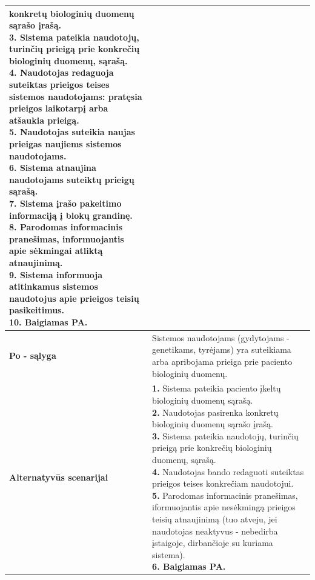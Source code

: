 \documentclass[12pt]{article}
\begin{document}
\begin{table}[htb!]
\begin{tabular}{|m{3cm}|m{13.7cm}|}
{{{            konkretų biologinių duomenų sąrašo įrašą.} \\
            \textbf{3.} {Sistema pateikia naudotojų,
            turinčių prieigą prie konkrečių biologinių duomenų, sąrašą.} \\
            \textbf{4.} \textcolor{dartmouthgreen}{Naudotojas redaguoja
            suteiktas prieigos teises sistemos naudotojams: pratęsia prieigos
            laikotarpį arba atšaukia prieigą.} \\
            \textbf{5.} \textcolor{dartmouthgreen}{Naudotojas suteikia
            naujas prieigas naujiems sistemos naudotojams.} \\
            \textbf{6.} {Sistema atnaujina naudotojams
            suteiktų prieigų sąrašą.} \\
            \textbf{7.} {Sistema įrašo pakeitimo
            informaciją į blokų grandinę.} \\
            \textbf{8.} {Parodomas informacinis
            pranešimas, informuojantis apie sėkmingai atliktą atnaujinimą.} \\
            \textbf{9.} {Sistema informuoja atitinkamus
            sistemos naudotojus apie prieigos teisių pasikeitimus.} \\
            \textbf{10. Baigiamas PA.}
        }}
        \\
        \hline
        \raggedleft \textbf{\cellcolor{deepchampagne}Po - sąlyga} &
        Sistemos naudotojams (gydytojams - genetikams, tyrėjams) yra suteikiama
        arba apribojama prieiga prie paciento biologinių duomenų. \\
        \hline
        \raggedleft \textbf{\cellcolor{deepchampagne}Alternatyvūs scenarijai} &
        \vskip 5pt
        \makecell[l]{\parbox[t]{13.7cm}{
            \textbf{1.} {Sistema pateikia paciento
            įkeltų biologinių duomenų sąrašą.} \\
            \textbf{2.} \textcolor{dartmouthgreen}{Naudotojas pasirenka
            konkretų biologinių duomenų sąrašo įrašą.} \\
            \textbf{3.} {Sistema pateikia naudotojų,
            turinčių prieigą prie konkrečių biologinių duomenų, sąrašą.} \\
            \textbf{4.} \textcolor{dartmouthgreen}{Naudotojas bando redaguoti
            suteiktas prieigos teises konkrečiam naudotojui.} \\
            \textbf{5.} \textcolor{dartmouthgreen}{Parodomas informacinis
            pranešimas, iformuojantis apie nesėkmingą prieigos teisių
            atnaujinimą (tuo atveju, jei naudotojas neaktyvus - nebedirba
            įstaigoje, dirbančioje su kuriama sistema).} \\
            \textbf{6. Baigiamas PA.}
        }}
        \\
        \hline
    \end{tabular}
\end{table}
\end{document}
